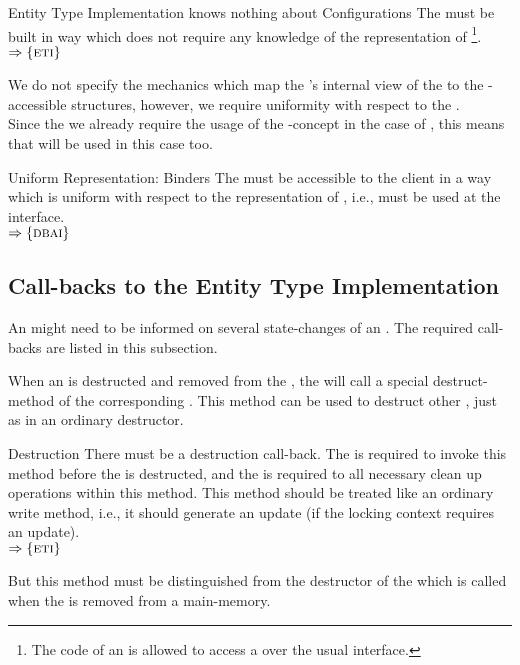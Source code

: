 \documentclass[a4paper, 12pt]{book}
\newcommand{\INTERFACE}[1]{$\Rightarrow\left\{#1\right\}$}
\begin{document}
\begin{requirement*}{Entity Type Implementation knows nothing about Configurations}
  The  must be built in way which does not
  require any knowledge of the representation of \footnote{The code of an  is allowed
    to access a  over the usual 
    interface.}.\\
  \INTERFACE{\ETI}
\end{requirement*}
We do not specify the mechanics which map the \SYNEIGHT's internal view
of the  to the -accessible
structures, however, we require uniformity with respect to the
.\\
%
Since the we already require the usage of the -concept in the case
of , this means that  will be used in this
case too. 
\begin{requirement*}{Uniform Representation: Binders}
  The  must be accessible to the
  client in a way which is uniform with respect to the representation of
  , i.e.,  must be used at the interface.\\
  \INTERFACE{\DBAI}
\end{requirement*}


\subsection{Call-backs to the Entity Type Implementation}

An  might need to be informed on several
state-changes of an . The required call-backs are listed in this
subsection. 

When an  is destructed and removed from the , the
\SYNEIGHT will call a special destruct-method of the corresponding
.
%
This method can be used to destruct other , just as in an
ordinary destructor. 
\begin{requirement*}{Destruction}
  There must be a destruction call-back. The \SYNEIGHT is required to
  invoke this method before the  is destructed, and the  is required to all necessary clean up operations within
  this method. This method should be treated like an ordinary write method,
  i.e., it should generate an update (if the locking context requires an
  update).\\
  \INTERFACE{\ETI}
\end{requirement*}
%
But this method must be distinguished from the destructor of the
 which is called when the  is
removed from a  main-memory.
\end{document}
